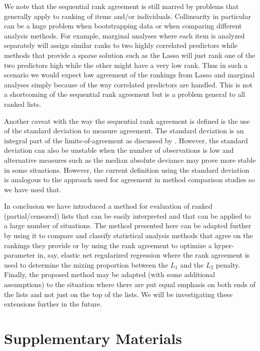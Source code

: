 \documentclass[oupdraft]{bio}
\newcommand{\added}[1]{{\color{added}{}#1}}
\begin{document}
We note that the sequential rank agreement is still marred by problems
that generally apply to ranking of items and/or
individuals. Collinearity in particular can be a huge problem when
bootstrapping data or when comparing different analysis methods. For
example, marginal analyses where each item is analyzed separately will
assign similar ranks to two highly correlated predictors while methods
that provide a sparse solution such as the Lasso will just rank one of
the two predictors high while the other might have a very low rank.
Thus in such a scenario we would expect low agreement of the rankings
from Lasso and marginal analyses simply because of the way correlated
predictors are handled. This is not a shortcoming of the sequential
rank agreement but is a problem general to all ranked lists.

Another caveat with the way the sequential rank agreement is defined
is the use of the standard deviation to measure agreement. The
standard deviation is an integral part of the limits-of-agreement as
discussed by \citet{alt:bland:1983}. However, the standard deviation
can also be unstable when the number of observations is low and
alternative measures such as the median absolute deviance may prove more
stable in some situations. However, the current definition using the
standard deviation is analogous to the approach used for agreement in
method comparison studies so we have used that.

In conclusion we have introduced a method for evaluation of ranked
(partial/censored) lists that can be easily interpreted and that can
be applied to a large number of situations.  The method presented here
can be adapted further by using it to compare and classify statistical
analysis methods that agree on the rankings they provide or by using
the rank agreement to optimize a hyper-parameter in, say, elastic net
regularized regression where the rank agreement is used to determine
the mixing proportion between the $L_1$ and the $L_2$ penalty.
\added{Finally, the proposed method may be adapted (with some
  additional assumptions) to the situation where there are put equal
  emphasis on both ends of the lists and not just on the top of the
  lists.}
We will be investigating these extensions further in the future.

\section{Supplementary Materials}
\label{sec5}
\end{document}
